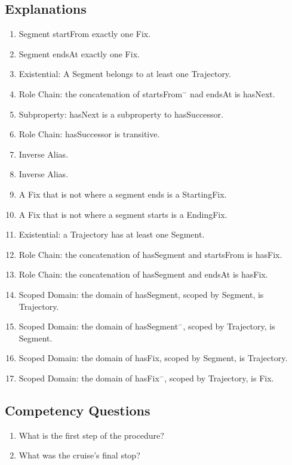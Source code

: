 \subsection{Explanations}
\label{exp:Trajectory}
\begin{enumerate}
\item \textsf{Segment} \textsf{startFrom} exactly one \textsf{Fix}.
\item \textsf{Segment} \textsf{endsAt} exactly one \textsf{Fix}.
\item Existential: A \textsf{Segment} belongs to at least one \textsf{Trajectory}.
\item Role Chain: the concatenation of \textsf{startsFrom}$^-$ nad \textsf{endsAt} is \textsf{hasNext}.
\item Subproperty: \textsf{hasNext} is a subproperty to \textsf{hasSuccessor}.
\item Role Chain: \textsf{hasSuccessor} is transitive.
\item Inverse Alias.
\item Inverse Alias.
\item A \textsf{Fix} that is not where a segment ends is a \textsf{StartingFix}.
\item A \textsf{Fix} that is not where a segment starts is a \textsf{EndingFix}.
\item Existential: a \textsf{Trajectory} has at least one \textsf{Segment}.
\item Role Chain: the concatenation of \textsf{hasSegment} and \textsf{startsFrom} is \textsf{hasFix}.
\item Role Chain: the concatenation of \textsf{hasSegment} and \textsf{endsAt} is \textsf{hasFix}.
\item Scoped Domain: the domain of \textsf{hasSegment}, scoped by \textsf{Segment}, is \textsf{Trajectory}.
\item Scoped Domain: the domain of \textsf{hasSegment}$^-$, scoped by \textsf{Trajectory}, is \textsf{Segment}.
\item Scoped Domain: the domain of \textsf{hasFix}, scoped by \textsf{Segment}, is \textsf{Trajectory}.
\item Scoped Domain: the domain of \textsf{hasFix}$^-$, scoped by \textsf{Trajectory}, is \textsf{Fix}.
\end{enumerate}

\subsection{Competency Questions}
\label{cqs:Trajectory}
\begin{enumerate}[CQ1.]
\item What is the first step of the procedure?
\item What was the cruise's final stop?
\end{enumerate}

\newpage
